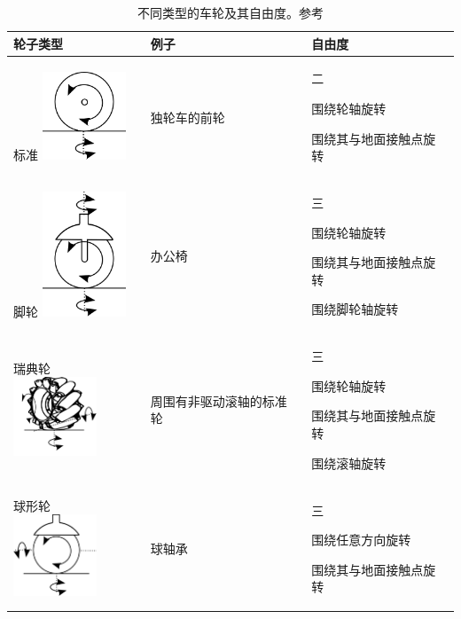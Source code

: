 \begin{table}
\begin{tabular}{p{2.8cm}p{3cm}p{4cm}}
\hline
轮子类型 & 例子 & 自由度\\
\hline
标准 \includegraphics[width=2.5cm]{figs/wheeltype_standard.png} & 独轮车的前轮	 & 二
\begin{compactitem}
\item 围绕轮轴旋转
\item 围绕其与地面接触点旋转
\end{compactitem}\\
\hline
脚轮	\includegraphics[width=2.5cm]{figs/wheeltype_caster.png}& 办公椅 & 三
\begin{compactitem}
\item 围绕轮轴旋转
\item 围绕其与地面接触点旋转
\item 围绕脚轮轴旋转
\end{compactitem}\\
\hline
瑞典轮 \includegraphics[width=2.5cm]{figs/wheeltype_swedish.png}& 周围有非驱动滚轴的标准轮 & 三
\begin{compactitem}
\item 围绕轮轴旋转
\item 围绕其与地面接触点旋转
\item 围绕滚轴旋转
\end{compactitem}\\
\hline
球形轮 \includegraphics[width=2.5cm]{figs/wheeltype_spherical.png}& 球轴承 & 三
\begin{compactitem}
\item 围绕任意方向旋转
\item 围绕其与地面接触点旋转
\end{compactitem}\\
\hline
\end{tabular}
\caption{不同类型的车轮及其自由度。参考\protect{}
\label{tab:wheels}}
\end{table}


